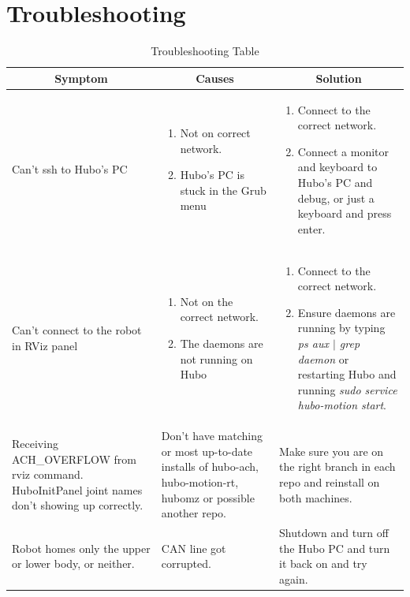 \documentclass[letterpaper, 10 pt]{report}
\begin{document}
%
\clearpage
\chapter{Troubleshooting}\label{chap:troubleshooting}
\begin{table}[ht]
  \centering
  \caption{Troubleshooting Table}
  \begin{tabular}{|p{4.5cm}|p{4.5cm}|p{4.5cm}|} \hline
    \multicolumn{1}{|c|}{Symptom} & \multicolumn{1}{|c|}{Causes} & \multicolumn{1}{|c|}{Solution} \\ \hline
    Can't ssh to Hubo's PC & \begin{enumerate} \item Not on correct network. \item Hubo's PC is stuck in the Grub menu \end{enumerate} & \begin{enumerate} \item Connect to the correct network. \item Connect a monitor and keyboard to Hubo's PC and debug, or just a keyboard and press enter. \end{enumerate} \\
    \hline
    Can't connect to the robot in RViz panel & \begin{enumerate} \item Not on the correct network. \item The daemons are not running on Hubo \end{enumerate} & \begin{enumerate} \item Connect to the correct network. \item Ensure daemons are running by typing \textit{ps aux $|$ grep daemon} or restarting Hubo and running \textit{sudo service hubo-motion start}. \end{enumerate} \\
    \hline
    Receiving ACH\_OVERFLOW from rviz command. \newline HuboInitPanel joint names don't showing up correctly. & Don't have matching or most up-to-date installs of hubo-ach, hubo-motion-rt, hubomz or possible another repo. & Make sure you are on the right branch in each repo and reinstall on both machines. \\
    \hline
    Robot homes only the upper or lower body, or neither. & CAN line got corrupted. & Shutdown and turn off the Hubo PC and turn it back on and try again. \\
    \hline
  \end{tabular} \label{tbl:troubleshooting}
\end{table}


%

\end{document}
